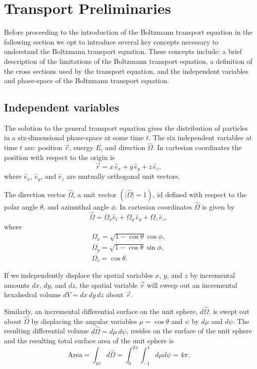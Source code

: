\section{Transport Preliminaries}
Before proceeding to the introduction of the Boltzmann transport equation in the following section we opt to introduce several key concepts necessary to understand the Boltzmann transport equation. These concepts include: a brief description of the limitations of the Boltzmann transport equation, a definition of the cross sections used by the transport equation, and the independent variables and phase-space of the Boltzmann transport equation.

\subsection{Independent variables}
The solution to the general transport equation gives the distribution of particles in a six-dimensional phase-space at some time $t$. The six independent variables at time $t$ are: position $\vec{r}$, energy $E$, and direction $\hat{\Omega}$. In cartesian coordinates the position with respect to the origin is
\begin{equation}
  \vec{r} = x \, \hat{e}_x + y \, \hat{e}_y + z \, \hat{e}_z,
\end{equation}
where $\hat{e}_x$, $\hat{e}_y$, and $\hat{e}_z$ are mutually orthogonal unit vectors. 

The direction vector $\hat{\Omega}$, a unit vector $(\vert \hat{\Omega} \vert = 1)$, id defined with respect to the polar angle $\theta$, and azimuthal angle $\phi$. In cartesian coordinates $\hat{\Omega}$ is given by
\begin{equation}
  \hat{\Omega} = \Omega_x \hat{e}_i + \Omega_y \, \hat{e}_y + \Omega_z \, \hat{e}_z,
\end{equation}
where
\begin{gather}
  \Omega_x = \sqrt{1 - \cos \theta} \cos \phi, \\
  \Omega_y = \sqrt{1 - \cos \theta} \sin \phi, \\
  \Omega_z = \cos \theta.
\end{gather}

If we independently displace the spatial variables $x$, $y$, and $z$ by incremental amounts $dx$, $dy$, and $dz$, the spatial variable $\vec{r}$ will sweep out an incremental hexahedral volume $dV = dx \, dy \, dz$ about $\vec{r}$.

Similarly, an incremental differential surface on the unit sphere, $d \hat{\Omega}$, is swept out about $\hat{\Omega}$ by displacing the angular variables $\mu = \cos \theta$ and $\psi$ by $d\mu$ and $d \psi$. The resulting differential volume $d \hat{\Omega} = d \mu \, d \psi$, resides on the surface of the unit sphere and the resulting total surface area of the unit sphere is 
\begin{equation}
  \text{Area} = \int_{4 \pi} d \hat{\Omega} = \int_{0}^{2\pi} \int_{-1}^1 d\mu d\psi = 4 \pi.
\end{equation}

